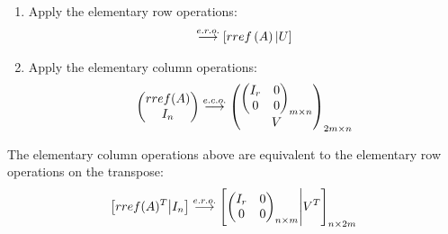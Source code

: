 \documentclass[pdf,9pt]{beamer}
\begin{document}
\begin{frame}[fragile]
\begin{proofnoend}
    \begin{enumerate}
	\item Apply the elementary row operations:
	     \begin{align*}
		 [A | I_m]
		\stackrel{e.r.o.}{\longrightarrow}
		 [\RRef\left(A\right)| U]
	     \end{align*}
	\item Apply the elementary column operations:
	    \begin{align*}
		\begin{pmatrix} \mathop{rref}(A) \cr I_n \end{pmatrix}
		\stackrel{e.c.o.}{\longrightarrow}
	    \begin{pmatrix} \begin{pmatrix} I_r & 0 \cr 0 & 0 \end{pmatrix}_{m \times n} \cr V \end{pmatrix}_{2m \times n}
	    \end{align*}
    \end{enumerate}
    \myQED
\end{proofnoend}
   \vfill
   \begin{remark}
       The elementary column operations above are equivalent to the elementary row operations on the transpose:
	    \begin{align*}
		\left[\mathop{rref}(A)^T \middle| I_n \right]
		\stackrel{e.r.o.}{\longrightarrow}
	    \left[\begin{pmatrix} I_r & 0 \cr 0 & 0 \end{pmatrix}_{n \times m} \middle| V^T\right]_{n \times 2m}
	    \end{align*}
   \end{remark}
\end{frame}
\end{document}
